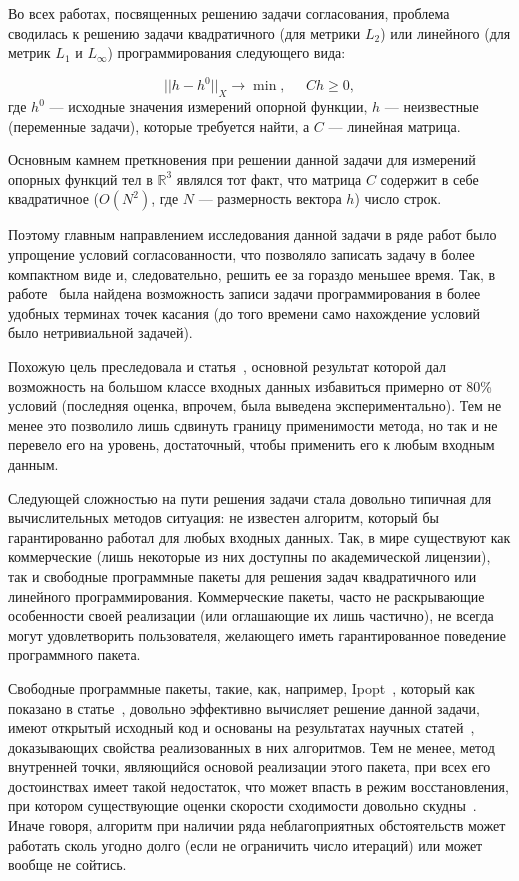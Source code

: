 \documentclass[a4paper, 11pt]{article}
\theoremstyle{MyDefinitionStyle}
\theoremstyle{MyTheoremStyle}
\begin{document}
Во всех работах, посвященных решению задачи согласования, проблема сводилась к
решению задачи квадратичного (для метрики $L_2$) или линейного (для метрик
$L_1$ и $L_\infty$) программирования следующего вида:

\begin{equation*}
 ||h - h^0||_X \to \min, \;\;\;\;\; C h \ge 0,
\end{equation*}
где $h^0$ --- исходные значения измерений опорной функции, $h$ --- неизвестные
(переменные задачи), которые требуется найти, а $C$ --- линейная матрица.

Основным камнем преткновения при решении данной задачи для измерений опорных
функций тел в $\mathbb{R}^3$ являлся тот факт, что матрица $C$ содержит в себе
квадратичное ($O(N^2)$, где $N$ --- размерность вектора $h$) число строк.

Поэтому главным направлением исследования данной задачи в ряде работ было
упрощение условий согласованности, что позволяло записать задачу в более
компактном виде и, следовательно, решить ее за гораздо меньшее время. Так, в
работе~\cite{GardnerKiderlen} была найдена возможность записи задачи
программирования в более удобных терминах точек касания (до того времени само
нахождение условий было нетривиальной задачей).

Похожую цель преследовала и статья~\cite{palachev}, основной результат которой
дал возможность на большом классе входных данных избавиться примерно от 80\% условий
(последняя оценка, впрочем, была выведена экспериментально). Тем не
менее это позволило лишь сдвинуть границу применимости метода, но так и не
перевело его на уровень, достаточный, чтобы применить его к любым входным
данным.

Следующей сложностью на пути решения задачи стала довольно типичная для
вычислительных методов ситуация: не известен алгоритм, который бы
гарантированно работал для любых входных данных. Так, в мире существуют
как коммерческие (лишь некоторые из них доступны по академической лицензии),
так и свободные программные пакеты для решения задач квадратичного или
линейного программирования.
Коммерческие пакеты, часто не раскрывающие особенности своей реализации (или
оглашающие их лишь частично), не всегда могут удовлетворить пользователя,
желающего иметь гарантированное поведение программного пакета.

Свободные программные пакеты, такие, как, например, Ipopt~\cite{Ipopt}, который
как показано в статье~\cite{palachev}, довольно эффективно вычисляет решение
данной задачи, имеют открытый исходный код и основаны на результатах
научных статей~\cite{WachterBiegler, WachterBiegler2}, доказывающих
свойства реализованных в них алгоритмов. Тем не менее, метод внутренней точки,
являющийся основой реализации этого пакета, при всех его достоинствах
имеет такой недостаток,
что может впасть в режим восстановления, при котором существующие оценки
скорости сходимости довольно скудны~\cite{WachterBiegler2}.
Иначе говоря, алгоритм при наличии ряда неблагоприятных обстоятельств
может работать сколь угодно долго (если не ограничить число итераций) или
может вообще не сойтись.
\end{document}
